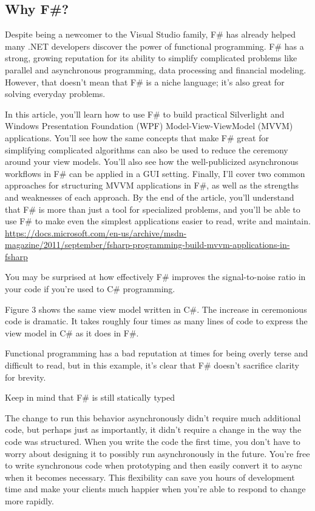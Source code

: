 \subsection{Why F\#?}
    Despite being a newcomer to the Visual Studio family, F\# has already helped many .NET developers discover the power of functional programming. F\# has a strong, growing reputation for its ability to simplify complicated problems like parallel and asynchronous programming, data processing and financial modeling. However, that doesn’t mean that F\# is a niche language; it’s also great for solving everyday problems.
    
    In this article, you’ll learn how to use F\# to build practical Silverlight and Windows Presentation Foundation (WPF) Model-View-ViewModel (MVVM) applications. You’ll see how the same concepts that make F\# great for simplifying complicated algorithms can also be used to reduce the ceremony around your view models. You’ll also see how the well-publicized asynchronous workflows in F\# can be applied in a GUI setting. Finally, I’ll cover two common approaches for structuring MVVM applications in F\#, as well as the strengths and weaknesses of each approach. By the end of the article, you’ll understand that F\# is more than just a tool for specialized problems, and you’ll be able to use F\# to make even the simplest applications easier to read, write and maintain. \\
    \url{https://docs.microsoft.com/en-us/archive/msdn-magazine/2011/september/fsharp-programming-build-mvvm-applications-in-fsharp}
    
    You may be surprised at how effectively F\# improves the signal-to-noise ratio in your code if you’re used to C\# programming.
    
    Figure 3 shows the same view model written in C\#. The increase in ceremonious code is dramatic. It takes roughly four times as many lines of code to express the view model in C\# as it does in F\#.
    
    
    Functional programming has a bad reputation at times for being overly terse and difficult to read, but in this example, it’s clear that F\# doesn’t sacrifice clarity for brevity.
    
    Keep in mind that F\# is still statically typed
    
    The change to run this behavior asynchronously didn’t require much additional code, but perhaps just as importantly, it didn’t require a change in the way the code was structured. When you write the code the first time, you don’t have to worry about designing it to possibly run asynchronously in the future. You’re free to write synchronous code when prototyping and then easily convert it to async when it becomes necessary. This flexibility can save you hours of development time and make your clients much happier when you’re able to respond to change more rapidly.
    
